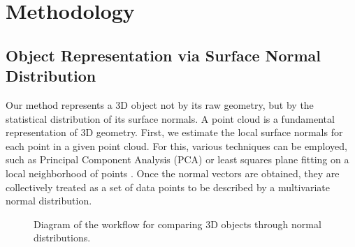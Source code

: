 \documentclass{article}
\begin{document}

\section{Methodology}

\subsection{Object Representation via Surface Normal Distribution}
Our method represents a 3D object not by its raw geometry, but by the statistical distribution of its surface normals. A point cloud is a fundamental representation of 3D geometry. First, we estimate the local surface normals for each point in a given point cloud. For this, various techniques can be employed, such as Principal Component Analysis (PCA) or least squares plane fitting on a local neighborhood of points \cite{normal_estimation_method}. Once the normal vectors are obtained, they are collectively treated as a set of data points to be described by a multivariate normal distribution.

\begin{figure}[H]
    \centering
    \caption{Diagram of the workflow for comparing 3D objects through normal distributions.}
    \label{fig:method_diagram}
\end{figure}
\end{document}
